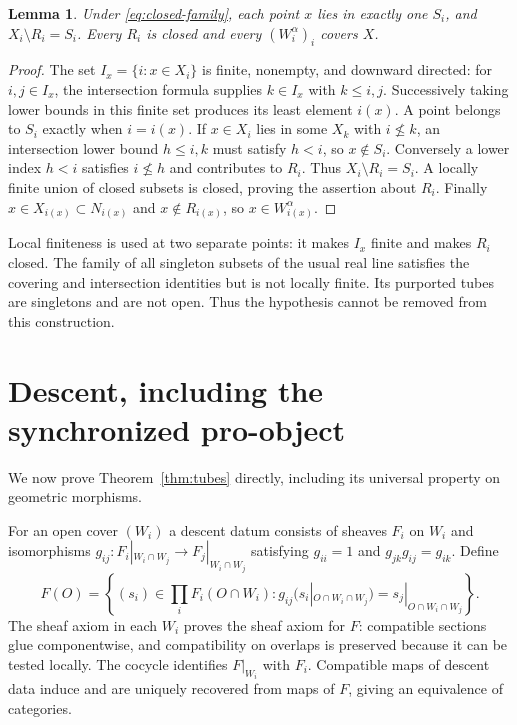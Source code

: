 \documentclass[11pt,a4paper]{article}
\newtheorem{lemma}[theorem]{Lemma}
\theoremstyle{definition}
\begin{document}
\begin{lemma}\label{lem:cover}
Under \eqref{eq:closed-family}, each point $x$ lies in exactly one $S_i$, and $X_i\setminus R_i=S_i$. Every $R_i$ is closed and every $(W_i^\alpha)_i$ covers $X$.
\end{lemma}
\begin{proof}
The set $I_x=\{i:x\in X_i\}$ is finite, nonempty, and downward directed: for $i,j\in I_x$, the intersection formula supplies $k\in I_x$ with $k\le i,j$. Successively taking lower bounds in this finite set produces its least element $i(x)$. A point belongs to $S_i$ exactly when $i=i(x)$. If $x\in X_i$ lies in some $X_k$ with $i\nleq k$, an intersection lower bound $h\le i,k$ must satisfy $h<i$, so $x\notin S_i$. Conversely a lower index $h<i$ satisfies $i\nleq h$ and contributes to $R_i$. Thus $X_i\setminus R_i=S_i$. A locally finite union of closed subsets is closed, proving the assertion about $R_i$. Finally $x\in X_{i(x)}\subset N_{i(x)}$ and $x\notin R_{i(x)}$, so $x\in W_{i(x)}^\alpha$.
\end{proof}

Local finiteness is used at two separate points: it makes $I_x$ finite and makes $R_i$ closed. The family of all singleton subsets of the usual real line satisfies the covering and intersection identities but is not locally finite. Its purported tubes are singletons and are not open. Thus the hypothesis cannot be removed from this construction.

\section{Descent, including the synchronized pro-object}
We now prove Theorem~\ref{thm:tubes} directly, including its universal property on geometric morphisms.

For an open cover $(W_i)$ a descent datum consists of sheaves $F_i$ on $W_i$ and isomorphisms $g_{ij}:F_i|_{W_i\cap W_j}\to F_j|_{W_i\cap W_j}$ satisfying $g_{ii}=1$ and $g_{jk}g_{ij}=g_{ik}$. Define
\[
 F(O)=\left\{(s_i)\in\prod_iF_i(O\cap W_i):
 g_{ij}(s_i|_{O\cap W_i\cap W_j})=s_j|_{O\cap W_i\cap W_j}\right\}.
\]
The sheaf axiom in each $W_i$ proves the sheaf axiom for $F$: compatible sections glue componentwise, and compatibility on overlaps is preserved because it can be tested locally. The cocycle identifies $F|_{W_i}$ with $F_i$. Compatible maps of descent data induce and are uniquely recovered from maps of $F$, giving an equivalence of categories.
\end{document}
